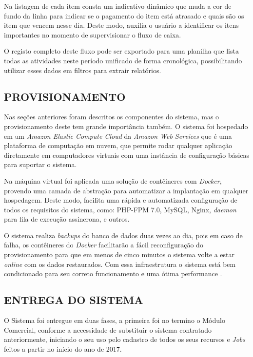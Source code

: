 \documentclass[
  12pt,            %
  openany,
  oneside,
  a4paper,         %
  english,      %
  brazil
]{article}
\numberwithin{figure}{section}
\numberwithin{table}{section}
\begin{document}
Na listagem de cada item consta um indicativo dinâmico que muda a cor de fundo da linha para indicar se o pagamento do item está atrasado e quais são os item que vencem nesse dia. Deste modo, auxilia o usuário a identificar os itens importantes no momento de supervisionar o fluxo de caixa.

O registo completo deste fluxo pode ser exportado para uma planilha que lista todas as atividades neste período unificado de forma cronológica, possibilitando utilizar esses dados em filtros para extrair relatórios.



\subsection{PROVISIONAMENTO}

Nas seções anteriores foram descritos os componentes do sistema, mas o provisionamento deste tem grande importância também. O sistema foi hospedado em um \textit{Amazon Elastic Compute Cloud} da \textit{Amazon Web Services} que é uma plataforma de computação em nuvem, que permite rodar qualquer aplicação diretamente em computadores virtuais com uma instância de configuração básicas para suportar o sistema.

Na máquina virtual foi aplicada uma solução de contêineres com \textit{Docker}, provendo uma camada de abstração para automatizar a implantação em qualquer hospedagem. Deste modo, facilita uma rápida e automatizada configuração de todos os requisitos do sistema, como: PHP-FPM 7.0, MySQL, Nginx, \textit{daemon} para fila de execução assíncrona, e outros.

O sistema realiza \textit{backups} do banco de dados duas vezes ao dia, pois em caso de falha, os contêineres do \textit{Docker} facilitarão a fácil reconfiguração do provisionamento para que em menos de cinco minutos o sistema volte a estar \textit{online} com os dados restaurados. Com essa infraestrutura o sistema está bem condicionado para seu correto funcionamento e uma ótima performance .


\subsection{ENTREGA DO SISTEMA}

O Sistema foi entregue em duas fases, a primeira foi no termino o Módulo Comercial, conforme a necessidade de substituir o sistema contratado anteriormente, iniciando o seu uso pelo cadastro de todos os seus recursos e \textit{Jobs} feitos a partir no início do ano de 2017.
\end{document}
